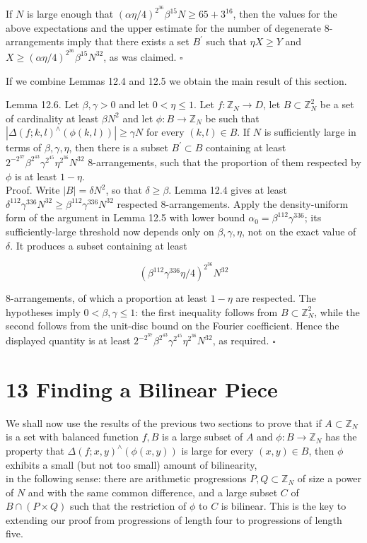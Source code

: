 \documentclass[10pt]{article}
\begin{document}
If $N$ is large enough that $(\alpha \eta / 4)^{2^{36}} \beta^{15} N \geqslant 65+3^{16}$, then the values for the above expectations and the upper estimate for the number of degenerate 8-arrangements imply that there exists a set $B^{\prime}$ such that $\eta X \geqslant Y$ and $X \geqslant(\alpha \eta / 4)^{2^{36}} \beta^{15} N^{32}$, as was claimed. \(\square\)

If we combine Lemmas 12.4 and 12.5 we obtain the main result of this section.

Lemma 12.6. Let $\beta, \gamma>0$ and let $0<\eta\leqslant 1$. Let $f: \mathbb{Z}_{N} \rightarrow D$, let $B \subset \mathbb{Z}_{N}^{2}$ be a set of cardinality at least $\beta N^{2}$ and let $\phi: B \rightarrow \mathbb{Z}_{N}$ be such that $\left|\Delta(f ; k, l)^{\wedge}(\phi(k, l))\right| \geqslant \gamma N$ for every $(k, l) \in B$. If $N$ is sufficiently large in terms of $\beta,\gamma,\eta$, then there is a subset $B^{\prime} \subset B$ containing at least $2^{-2^{37}} \beta^{2^{43}} \gamma^{2^{45}} \eta^{2^{36}} N^{32}$ 8-arrangements, such that the proportion of them respected by $\phi$ is at least $1-\eta$.\\
Proof. Write $|B|=\delta N^{2}$, so that $\delta\geqslant\beta$.  Lemma 12.4 gives at least $\delta^{112}\gamma^{336}N^{32}\geqslant\beta^{112}\gamma^{336}N^{32}$ respected 8-arrangements.  Apply the density-uniform form of the argument in Lemma 12.5 with lower bound $\alpha_{0}=\beta^{112}\gamma^{336}$; its sufficiently-large threshold now depends only on $\beta,\gamma,\eta$, not on the exact value of $\delta$.  It produces a subset containing at least

$$
 \left(\beta^{112}\gamma^{336}\eta/4\right)^{2^{36}}N^{32}
$$

8-arrangements, of which a proportion at least $1-\eta$ are respected.  The hypotheses imply $0<\beta,\gamma\leqslant1$: the first inequality follows from $B\subset\mathbb Z_N^2$, while the second follows from the unit-disc bound on the Fourier coefficient.  Hence the displayed quantity is at least $2^{-2^{37}}\beta^{2^{43}}\gamma^{2^{45}}\eta^{2^{36}}N^{32}$, as required. \(\square\)

\section*{13 Finding a Bilinear Piece}
We shall now use the results of the previous two sections to prove that if $A \subset \mathbb{Z}_{N}$ is a set with balanced function $f, B$ is a large subset of $A$ and $\phi: B \rightarrow \mathbb{Z}_{N}$ has the property that $\Delta(f ; x, y)^{\wedge}(\phi(x, y))$ is large for every $(x, y) \in B$, then $\phi$ exhibits a small (but not too small) amount of bilinearity,\\
in the following sense: there are arithmetic progressions $P, Q \subset \mathbb{Z}_{N}$ of size a power of $N$ and with the same common difference, and a large subset $C$ of $B \cap(P \times Q)$ such that the restriction of $\phi$ to $C$ is bilinear. This is the key to extending our proof from progressions of length four to progressions of length five.
\end{document}
